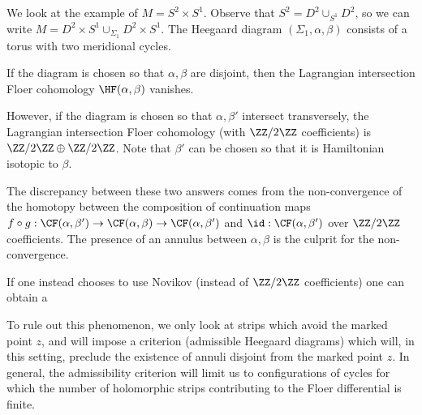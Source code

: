 

    We look at the example of $M=S^2\times S^1$. Observe that $S^2=D^2\cup_{S^1} D^2$, so we can write $M=D^2\times S^1 \cup_{\Sigma_1} D^2\times S^1$. 
    The Heegaard diagram $(\Sigma_1, \alpha, \beta)$ consists of a torus with two meridional cycles. 
    
    If the diagram is chosen so that $\alpha, \beta$ are disjoint, then the Lagrangian intersection Floer cohomology $\HF(\alpha, \beta)$ vanishes.
    
    However, if the diagram is chosen so that $\alpha, \beta'$ intersect transversely, the Lagrangian intersection Floer cohomology (with $\ZZ/2\ZZ$ coefficients) is $\ZZ/2\ZZ\oplus \ZZ/2\ZZ$. Note that $\beta'$ can be chosen so that it is Hamiltonian isotopic to $\beta$.
    
    The discrepancy between these two answers comes from the non-convergence of the homotopy between the composition of continuation maps  $f\circ g:\CF(\alpha, \beta')\to \CF(\alpha, \beta) \to \CF(\alpha, \beta')$ and $\id: \CF(\alpha, \beta')$ over $\ZZ/2\ZZ$ coefficients. The presence of an annulus between $\alpha, \beta$ is the culprit for the non-convergence.

    If one instead chooses to use Novikov (instead of $\ZZ/2\ZZ$ coefficients) one can obtain a 

    To rule out this phenomenon, we only look at strips which avoid the marked point $z$, and will impose a criterion (admissible Heegaard diagrams) which will, in this setting, preclude the existence of annuli disjoint from the marked point $z$.  In general, the admissibility criterion will limit us to configurations of cycles for which the number of holomorphic strips contributing to the Floer differential is finite.


